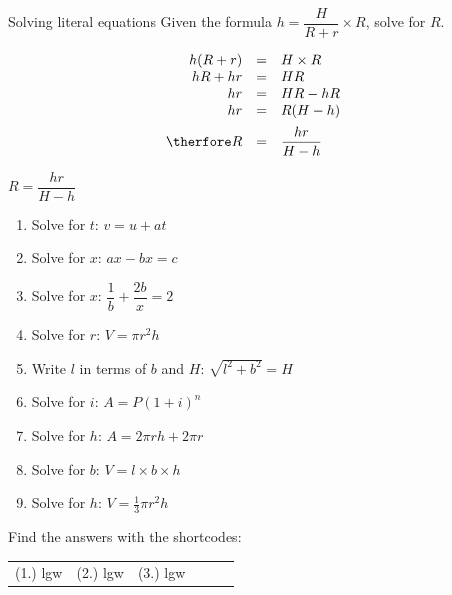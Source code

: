 \begin{wex}
{Solving literal equations}
{
Given the formula $h=\dfrac{H}{R+r} \times R$, solve for $R$.
}
{
\begin{equation*}
    \begin{array}{ccll}\hfill h(R+r)& =& H \times R\hfill & \\
	\hfill hR + hr& =& HR\hfill & \hfill \\
	\hfill hr & =& HR - hR\hfill \\
\hfill hr& =& R(H - h)\hfill \vspace{5pt}\\ 
\hfill \therfore R & =& \dfrac{hr}{H-h}\hfill 
    \end{array}
\end{equation*}

$R = \dfrac{hr}{H-h}$
} 
\end{wex}


\begin{exercises}{}
{
\begin{enumerate}[noitemsep, label=\textbf{\arabic*}. ] 
\item Solve for $t$: $v=u+at$
\item Solve for $x$: $ax-bx=c$ \vspace{5pt}
\item Solve for $x$: $\dfrac{1}{b}+\dfrac{2b}{x}=2$\vspace{5pt}
\item Solve for $r$: $V = \pi r^{2} h$
\item Write $l$ in terms of $b$ and $H$: $\sqrt{l^{2}+b^{2}}=H$
\item Solve for $i$: $A=P(1+i)^{n}$
\item Solve for $h$: $A=2\pi rh + 2 \pi r$
\item Solve for $b$: $V=l \times b \times h$
\item Solve for $h$: $V=\frac{1}{3}\pi r^{2}h$
\end{enumerate}

\par {} Find the answers with the shortcodes:
\par \begin{tabular}[h]{cccccc}
(1.) lgw  &  (2.) lgw  &  (3.) lgw  & \end{tabular}
}
\end{exercises}

